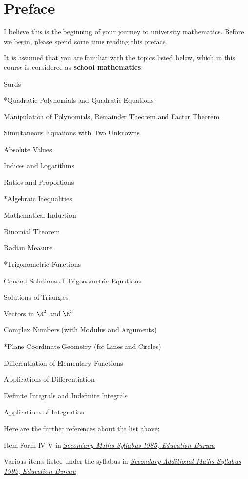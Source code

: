 \pagestyle{fancy}
\fancyhf{}
\setlength{\headheight}{15.2pt}
\fancyhead[R]{\nouppercase \lastrightmark}
\fancyfoot[L]{\gettitle}
\fancyfoot[R]{\thepage}

\section*{Preface}
I believe this is the beginning of your journey to university mathematics. Before we begin, please spend some time reading this preface.\n

It is assumed that you are familiar with the topics listed below, which in this course is considered as \textbf{school mathematics}:
\begin{alist}
  \item Surds
  \item **Quadratic Polynomials and Quadratic Equations
  \item Manipulation of Polynomials, Remainder Theorem and Factor Theorem
  \item Simultaneous Equations with Two Unknowns
  \item *Absolute Values
  \item Indices and Logarithms
  \item Ratios and Proportions
  \item **Algebraic Inequalities
  \item *Mathematical Induction
  \item *Binomial Theorem
  \item *Radian Measure
  \item **Trigonometric Functions
  \item *General Solutions of Trigonometric Equations
  \item *Solutions of Triangles
  \item *Vectors in $\R^{2}$ and $\R^{3}$
  \item *Complex Numbers (with Modulus and Arguments)
  \item **Plane Coordinate Geometry (for Lines and Circles)
  \item *Differentiation of Elementary Functions
  \item *Applications of Differentiation
  \item *Definite Integrals and Indefinite Integrals
  \item *Applications of Integration
\end{alist}
\pagebreak

Here are the further references about the list above:
\begin{Alist}
  \item Item Form IV-V in \href{https://www.edb.gov.hk/en/curriculum-development/kla/ma/curr/sec-math-1985.html}{\textit{Secondary Maths Syllabus 1985, Education Bureau}}
  \item Various items listed under the syllabus in \href{http://www.edb.gov.hk/en/curriculum-development/kla/ma/curr/add-math-1992.html}{\textit{Secondary Additional Maths Syllabus 1992, Education Bureau}}
\end{Alist}

